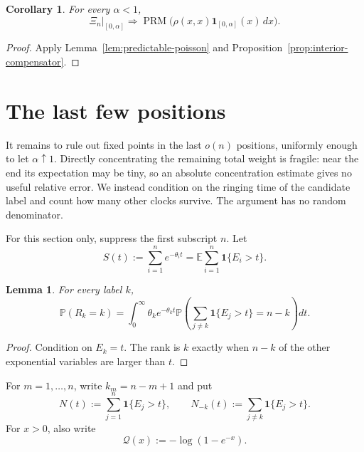 \documentclass[11pt]{article}
\newtheorem{lemma}[theorem]{Lemma}
\newtheorem{corollary}[theorem]{Corollary}
\theoremstyle{remark}
\theoremstyle{plain}
\newcommand{\E}{\mathbb E}
\newcommand{\Pp}{\mathbb P}
\newcommand{\one}{\mathbf 1}
\begin{document}
\begin{corollary}\label{cor:interior-poisson}
For every $\alpha<1$,
\begin{equation}\label{eq:interior-poisson}
 \Xi_n|_{[0,\alpha]}\Longrightarrow
 \operatorname{PRM}\bigl(\rho(x,x)\one_{[0,\alpha]}(x)\,dx\bigr).
\end{equation}
\end{corollary}

\begin{proof}
Apply Lemma~\ref{lem:predictable-poisson} and
Proposition~\ref{prop:interior-compensator}.
\end{proof}

\section{The last few positions}\label{sec:endpoint}

It remains to rule out fixed points in the last $o(n)$ positions, uniformly
enough to let $\alpha\uparrow1$.  Directly concentrating the remaining total
weight is fragile: near the end its expectation may be tiny, so an absolute
concentration estimate gives no useful relative error.  We instead condition
on the ringing time of the candidate label and count how many other clocks
survive.  The argument has no random denominator.

For this section only, suppress the first subscript $n$.  Let
\begin{equation}\label{eq:mean-survivors}
 S(t):=\sum_{i=1}^ne^{-\theta_i t}=\E\sum_{i=1}^n\one\{E_i>t\}.
\end{equation}

\begin{lemma}\label{lem:rank-integral}
For every label $k$,
\begin{equation}\label{eq:rank-integral}
 \Pp(R_k=k)=
 \int_0^\infty \theta_k e^{-\theta_k t}
 \Pp\left(\sum_{j\ne k}\one\{E_j>t\}=n-k\right)dt.
\end{equation}
\end{lemma}

\begin{proof}
Condition on $E_k=t$.  The rank is $k$ exactly when $n-k$ of the other
exponential variables are larger than $t$.
\end{proof}

For $m=1,\ldots,n$, write $k_m=n-m+1$ and put
\[
 N(t):=\sum_{j=1}^n\one\{E_j>t\},
 \qquad
 N_{-k}(t):=\sum_{j\ne k}\one\{E_j>t\}.
\]
For $x>0$, also write
\begin{equation}\label{eq:Q-function}
 \mathcal Q(x):=-\log(1-e^{-x}).
\end{equation}
\end{document}
